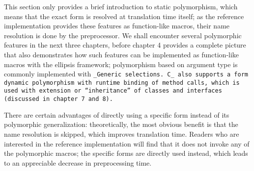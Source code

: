 This section only provides a brief introduction to static polymorphism,
which means that the exact form is resolved at translation time itself;
as the reference implementation provides these features as function-like macros,
their name resolution is done by the preprocessor.
We shall encounter several polymorphic features in the next three chapters,
before chapter 4 provides a complete picture that also demonstrates how such
features can be implemented as function-like macros with the ellipsis framework;
polymorphism based on argument type is commonly
implemented with \tt{_Generic} selections.
C\_ also supports a form dynamic polymorphism with runtime binding
of method calls, which is used with extension or ``inheritance''
of classes and interfaces (discussed in chapter 7 and 8).

There are certain advantages of directly using a specific form instead of its
polymorphic generalization: theoretically, the most obvious benefit is that
the name resolution is skipped, which improves translation time.
Readers who are interested in the reference implementation will find that it
does not invoke any of the polymorphic macros; the specific forms are directly
used instead, which leads to an appreciable decrease in preprocessing time.
